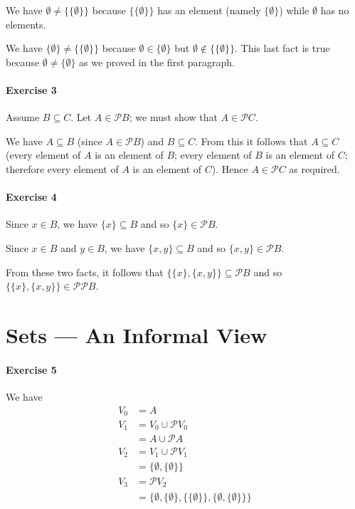 \documentclass{report}
\begin{document}
    We have $\emptyset \neq \{ \{ \emptyset \} \}$ because $\{ \{ \emptyset \} \}$ has an element (namely
    $\{ \emptyset \}$) while $\emptyset$ has no elements.

    We have $\{ \emptyset \} \neq \{ \{ \emptyset \} \}$ because $\emptyset \in \{ \emptyset \}$ but
    $\emptyset \notin \{ \{ \emptyset \} \}$. This last fact is true because $\emptyset \neq \{ \emptyset \}$
    as we proved in the first paragraph.

    \paragraph{Exercise 3}
    Assume $B \subseteq C$. Let $A \in \mathcal{P} B$; we must show that $A \in \mathcal{P} C$.

    We have $A \subseteq B$ (since $A \in \mathcal{P} B$) and $B \subseteq C$. From this it follows that
    $A \subseteq C$ (every element of $A$ is an element of $B$; every element of $B$ is an element of $C$;
    therefore every element of $A$ is an element of $C$). Hence $A \in \mathcal{P} C$ as required.

    \paragraph{Exercise 4}
    Since $x \in B$, we have $\{x\} \subseteq B$ and so $\{ x \} \in \mathcal{P} B$.

    Since $x \in B$ and $y \in B$, we have $\{ x,y \} \subseteq B$ and so $\{x,y\} \in \mathcal{P} B$.

    From these two facts, it follows that $\{ \{x\},\{x,y\}\} \subseteq \mathcal{P} B$ and so
    $\{ \{x\},\{x,y\}\} \in \mathcal{P} \mathcal{P} B$.

    \section{Sets --- An Informal View}

    \paragraph{Exercise 5}
    We have
    \begin{align*}
        V_0 & = A \\
        V_1 & = V_0 \cup \mathcal{P} V_0 \\
        & = A \cup \mathcal{P} A \\
        V_2 & = V_1 \cup \mathcal{P} V_1 \\
        & = \{ \emptyset, \{ \emptyset \} \} \\
        V_3 & = \mathcal{P} V_2 \\
        & = \{ \emptyset, \{ \emptyset \}, \{ \{ \emptyset \} \},
        \{ \emptyset, \{ \emptyset \} \} \}
    \end{align*}
\end{document}

